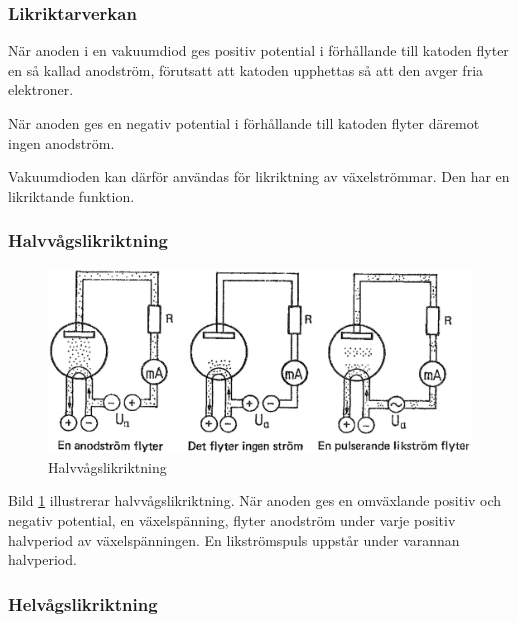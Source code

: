 \subsubsection{Likriktarverkan}

När anoden i en vakuumdiod ges positiv potential i förhållande till katoden flyter en så kallad anodström, förutsatt att katoden upphettas så att den avger fria elektroner.

När anoden ges en negativ potential i förhållande till katoden flyter däremot ingen anodström.

Vakuumdioden kan därför användas för likriktning av växelströmmar. Den har en likriktande funktion.

\subsubsection{Halvvågslikriktning}

\begin{figure}
\includegraphics[width=\textwidth]{images/cropped_pdfs/bild_2_2-27.pdf}
\caption{Halvvågslikriktning}
\label{fig:BildII2-27}
\end{figure}

Bild \ref{fig:BildII2-27} illustrerar halvvågslikriktning.
När anoden ges en omväxlande positiv och negativ potential, en växelspänning, flyter anodström under varje positiv halvperiod av växelspänningen.
En likströmspuls uppstår under varannan halvperiod.

\subsubsection{Helvågslikriktning}

